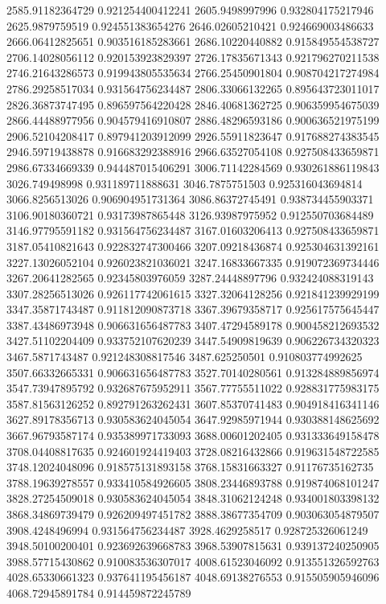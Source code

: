 {2585.91182364729 0.921254400412241
2605.9498997996 0.932804175217946
2625.9879759519 0.924551383654276
2646.02605210421 0.924669003486633
2666.06412825651 0.903516185283661
2686.10220440882 0.915849554538727
2706.14028056112 0.920153923829397
2726.17835671343 0.921796270211538
2746.21643286573 0.919943805535634
2766.25450901804 0.908704217274984
2786.29258517034 0.931564756234487
2806.33066132265 0.895643723011017
2826.36873747495 0.896597564220428
2846.40681362725 0.906359954675039
2866.44488977956 0.904579416910807
2886.48296593186 0.900636521975199
2906.52104208417 0.897941203912099
2926.55911823647 0.917688274383545
2946.59719438878 0.916683292388916
2966.63527054108 0.927508433659871
2986.67334669339 0.944487015406291
3006.71142284569 0.930261886119843
3026.749498998 0.931189711888631
3046.7875751503 0.925316043694814
3066.8256513026 0.906904951731364
3086.86372745491 0.938734455903371
3106.90180360721 0.93173987865448
3126.93987975952 0.912550703684489
3146.97795591182 0.931564756234487
3167.01603206413 0.927508433659871
3187.05410821643 0.922832747300466
3207.09218436874 0.925304631392161
3227.13026052104 0.926023821036021
3247.16833667335 0.919072369734446
3267.20641282565 0.92345803976059
3287.24448897796 0.932424088319143
3307.28256513026 0.926117742061615
3327.32064128256 0.921841239929199
3347.35871743487 0.911812090873718
3367.39679358717 0.925617575645447
3387.43486973948 0.906631656487783
3407.47294589178 0.900458212693532
3427.51102204409 0.933752107620239
3447.54909819639 0.906226734320323
3467.5871743487 0.921248308817546
3487.625250501 0.910803774992625
3507.66332665331 0.906631656487783
3527.70140280561 0.913284889856974
3547.73947895792 0.932687675952911
3567.77755511022 0.928831775983175
3587.81563126252 0.892791263262431
3607.85370741483 0.904918416341146
3627.89178356713 0.930583624045054
3647.92985971944 0.930388148625692
3667.96793587174 0.935389971733093
3688.00601202405 0.931333649158478
3708.04408817635 0.924601924419403
3728.08216432866 0.919631548722585
3748.12024048096 0.918575131893158
3768.15831663327 0.91176735162735
3788.19639278557 0.933410584926605
3808.23446893788 0.919874068101247
3828.27254509018 0.930583624045054
3848.31062124248 0.934001803398132
3868.34869739479 0.926209497451782
3888.38677354709 0.903063054879507
3908.4248496994 0.931564756234487
3928.4629258517 0.928725326061249
3948.50100200401 0.923692639668783
3968.53907815631 0.939137240250905
3988.57715430862 0.910083536307017
4008.61523046092 0.913551326592763
4028.65330661323 0.937641195456187
4048.69138276553 0.915505905946096
4068.72945891784 0.914459872245789
}
